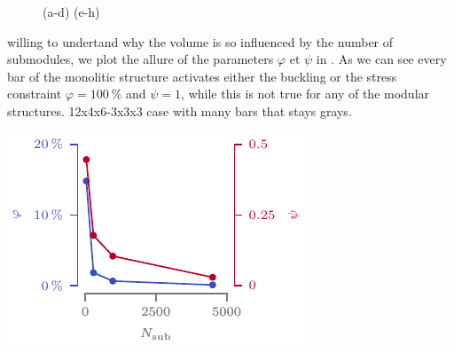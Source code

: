 \begin{figure}
        \hfill
        \hfill
        \hspace*{\fill}
        \caption{(a-d) (e-h)}
        \label{fig:05_scale_results}
    \end{figure}

    
    willing to undertand why the volume is so influenced by the number of submodules, we plot the allure of the parameters $\varphi$ et $\psi$ in . As we can see every bar of the monolitic structure activates either the buckling or the stress constraint $\varphi=\qty{100}{\percent}$ and $\psi=1$, while this is  not true for any of the modular structures. 12x4x6-3x3x3 case with many bars that stays grays.
    \begin{marginfigure}
        \centering
        \includegraphics[width=\linewidth]{figures/05_cellular_opt/00_module_scale_tab/scale_tab_param.pdf}
        \caption{}
        \label{fig:05_scale_param}
    \end{marginfigure}
    
